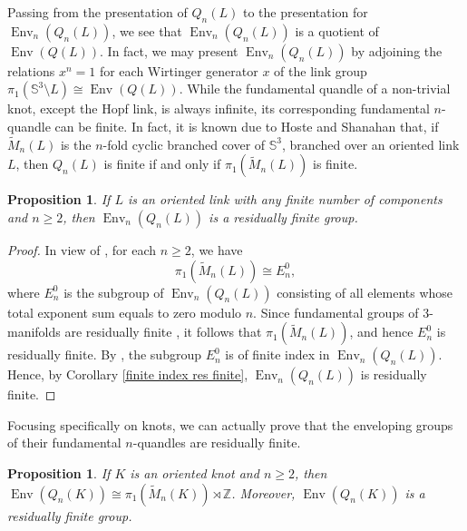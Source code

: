 \documentclass[12pt]{amsart}
\newtheorem{prop}[theorem]{Proposition}
\theoremstyle{definition}
\numberwithin{equation}{subsection}
\newcommand{\Env}{\operatorname{Env}}
\begin{document}
Passing from the presentation of $Q_{n}(L)$ to the presentation for $\Env_{n}(Q_{n}(L))$, we see that $\Env_{n}\left(Q_{n}(L)\right)$ is a quotient of $\Env(Q(L))$. In fact, we may present $\Env_{n}\left(Q_{n}(L)\right)$ by adjoining the relations $x^{n}=1$ for each Wirtinger generator $x$ of the link group $\pi_{1}\left(\mathbb{S}^{3} \setminus L\right)\cong \Env(Q(L))$. While the fundamental quandle of a non-trivial knot, except the Hopf link, is always infinite, its corresponding fundamental $n$-quandle can be finite. In fact, it is known due to Hoste and Shanahan \cite[Theorem 3.1]{MR3704243} that, if $\widetilde{M}_{n}(L)$ is the $n$-fold cyclic branched cover of $\mathbb{S}^{3}$, branched over an  oriented  link $L$, then $Q_{n}(L)$ is finite if and only if $\pi_{1}(\widetilde{M}_{n}(L))$ is finite.
\par

 		
\begin{prop}
If $L$ is an oriented link with any finite number of components and $n \ge 2$, then $\Env_n\left(Q_{n}(L)\right)$ is a residually finite group.
\end{prop}

\begin{proof}
In view of \cite[Theorem 5.2.2]{MR2634013}, for each $n \ge 2$, we have $$\pi_{1}\left( \widetilde{M}_{n}(L)\right) \cong 
E_n^0,$$ where $E_n^0$ is the subgroup of $\Env_n(Q_{n}(L))$ consisting of all elements whose total exponent sum equals to zero modulo $n$. Since fundamental groups of 3-manifolds are residually finite \cite{hempel}, it follows that $\pi_{1}(\widetilde{M}_{n}(L))$, and hence $E_n^0$ is residually finite. By  \cite[Section 3]{MR3704243}, the subgroup $E_n^0$ is of finite index in $\Env_n\left(Q_{n}(L)\right)$. Hence, by Corollary \ref{finite index res finite}, $\Env_n\left(Q_{n}(L)\right)$ is residually finite.
\end{proof}

Focusing specifically on knots, we can actually prove that the enveloping groups of their fundamental $n$-quandles are residually finite.

\begin{prop}
If $K$ is an oriented knot and $n \ge 2$, then $\Env\left(Q_{n}(K)\right) \cong \pi_{1}(\widetilde{M}_{n}(K))\rtimes \mathbb{Z}$. Moreover, $\Env\left(Q_{n}(K)\right)$ is a residually finite group. 
\end{prop}
\end{document}
